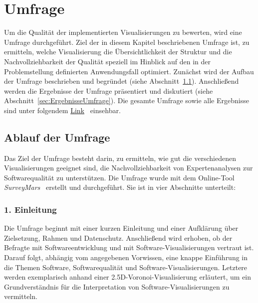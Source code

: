 \chapter{Umfrage} \label{sec:Umfrage}

Um die Qualität der implementierten Visualisierungen zu bewerten, wird eine Umfrage durchgeführt.
Ziel der in diesem Kapitel beschriebenen Umfrage ist, zu ermitteln, welche Visualisierung die Übersichtlichkeit der Struktur und die Nachvollziehbarkeit der Qualität speziell im Hinblick auf den in der Problemstellung definierten Anwendungsfall optimiert. Zunächst wird der Aufbau der Umfrage beschrieben und begründet (siehe Abschnitt~\ref{sec:AblaufUmfrage}). Anschließend werden die Ergebnisse der Umfrage präsentiert und diskutiert (siehe Abschnitt~\ref{sec:ErgebnisseUmfrage}). Die gesamte Umfrage sowie alle Ergebnisse sind unter folgendem \href{https://github.com/BenediktMehl/master-thesis/tree/main/anhang}{Link}~\cite{anhaenge_github} einsehbar.

\section{Ablauf der Umfrage} \label{sec:AblaufUmfrage}

Das Ziel der Umfrage besteht darin, zu ermitteln, wie gut die verschiedenen Visualisierungen geeignet sind, die Nachvollziehbarkeit von Expertenanalysen zur Softwarequalität zu unterstützen. Die Umfrage wurde mit dem Online-Tool \textit{SurveyMars}~\cite{surveymars_2023} erstellt und durchgeführt. Sie ist in vier Abschnitte unterteilt:

\subsection*{1. Einleitung} \label{sec:EinleitungUmfrage}
Die Umfrage beginnt mit einer kurzen Einleitung und einer Aufklärung über Zielsetzung, Rahmen und Datenschutz. Anschließend wird erhoben, ob der Befragte mit Softwareentwicklung und mit Software-Visualisierungen vertraut ist. Darauf folgt, abhängig vom angegebenen Vorwissen, eine knappe Einführung in die Themen Software, Softwarequalität und Software-Visualisierungen. Letztere werden exemplarisch anhand einer 2{.}5D-Voronoi-Visualisierung erläutert, um ein Grundverständnis für die Interpretation von Software-Visualisierungen zu vermitteln.

